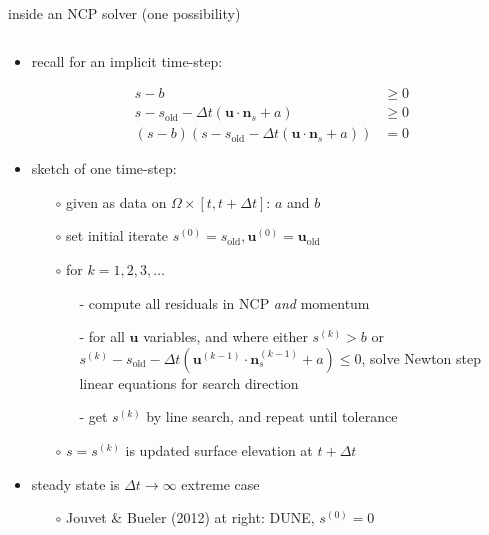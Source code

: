 \documentclass[10pt,hyperref,dvipsnames]{beamer}
\newcommand{\bn}{\mathbf{n}}
\newcommand{\bu}{\mathbf{u}}
\begin{document}
\begin{frame}{inside an NCP solver (one possibility)}

\begin{columns}
\begin{column}{0.7\textwidth}
\begin{itemize}
\item recall for an implicit time-step:

\vspace{-7mm}
\begin{align*}
s-b &\ge 0 \\
s - s_{\text{old}} - \Delta t\left(\bu \cdot \bn_s + a\right) &\ge 0 \\
(s-b) \left(s - s_{\text{old}} - \Delta t\left(\bu \cdot \bn_s + a\right)\right) &= 0
\end{align*}
\item sketch of one time-step:
    \begin{itemize}
    \item[$\circ$] given as data on $\Omega \times [t,t+\Delta t]$: $a$ and $b$
    \item[$\circ$] set initial iterate $s^{(0)}=s_{\text{old}}, \bu^{(0)}=\bu_{\text{old}}$
    \item[$\circ$] for $k=1,2,3,\dots$
        \begin{itemize}
        \item[-] compute all residuals in NCP \emph{and} momentum
        \item[-] for all $\bu$ variables, and where either $s^{(k)}>b$ or $s^{(k)} - s_{\text{old}} - \Delta t\left(\bu^{(k-1)} \cdot \bn_s^{(k-1)} + a\right) \le 0$, solve Newton step linear equations for search direction
        \item[-] get $s^{(k)}$ by line search, and repeat until tolerance
        \end{itemize}
    \item[$\circ$] $s=s^{(k)}$ is updated surface elevation at $t+\Delta t$
    \end{itemize}
\item steady state is $\Delta t \to \infty$ extreme case
    \begin{itemize}
    \item[$\circ$] Jouvet \& Bueler (2012) at right: DUNE, $s^{(0)}=0$
    \end{itemize}


\end{itemize}
\end{column}
\end{columns}
\end{frame}
\end{document}
